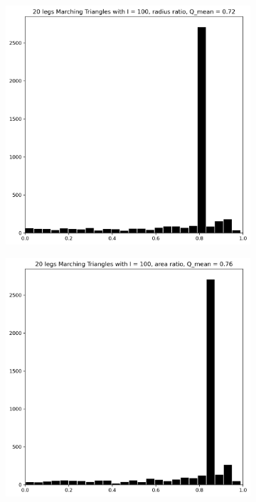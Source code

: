 \documentclass[acmtog]{acmart}
\begin{document}
\begin{figure}[H]
\begin{subfigure}{0.22\textwidth}
  \end{subfigure}
  \begin{subfigure}{0.22\textwidth}
    \includegraphics[width=\textwidth]{Images/histograms/20 legs Marching Triangles with I = 100, radius ratio.png}
    \centering
  \end{subfigure}\hfill
  \begin{subfigure}{0.22\textwidth}
    \centering
    \includegraphics[width=\textwidth]{Images/histograms/20 legs Marching Triangles with I = 100, area ratio.png}

\end{subfigure}
\end{figure}
\end{document}
